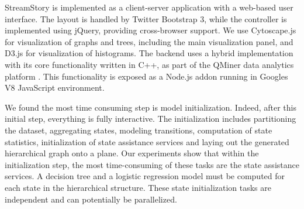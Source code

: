 StreamStory is implemented as a client-server application with a web-based user interface. %
The layout is handled by Twitter Bootstrap 3,%
 while the controller is implemented using jQuery, providing cross-browser support. We use Cytoscape.js for visualization of graphs and trees, including the main visualization panel, and D3.js for visualization of histograms. %
%
The backend uses a hybrid implementation with its core functionality written in C++, as part of the QMiner data analytics platform \cite{qminer}. This functionality is exposed as a Node.js addon running in Googles V8 JavaScript environment. 

We found the most time consuming step
is model initialization. Indeed, after this initial step, everything is fully interactive.
The initialization includes partitioning the dataset, aggregating states, modeling transitions,
computation of state statistics, initialization of state assistance services and laying out the generated
hierarchical graph onto a plane. Our experiments show that within the initialization step, the most time-consuming of these tasks are the state assistance services. A decision tree and a logistic regression
model must be computed for each state in the hierarchical structure. These state initialization tasks
are independent and can potentially be parallelized.

